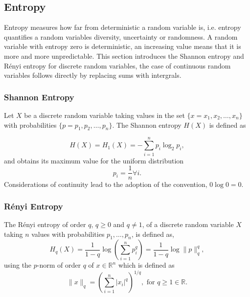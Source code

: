 \documentclass[12pt, twoside]{article}
\newcommand{\R}{\mathbb{R}}
\newcommand{\1}{\mathbb{1}}
\begin{document}
\subsection{Entropy}
Entropy measures how far from deterministic a random variable is, i.e. entropy quantifies a random variables diversity, uncertainty or randomness. 
A random variable with entropy zero is deterministic, an increasing value  means that it is more and more unpredictable.
This section introduces the Shannon entropy and R\'enyi entropy for discrete random variables, the case of continuous random variables follows directly by replacing sums with intergrals.
    
\subsubsection{Shannon Entropy}
Let $ X $ be a discrete random variable taking values in the set $ \{x = x_1, x_2, \ldots, x_n \} $ with probabilities $ \{p = p_1, p_2, \ldots, p_n \} $. The Shannon entropy $ H(X) $ is defined as 

\begin{equation}\label{Shannon1}
    H(X) = H_1(X) = - \sum_{i = 1} ^ n p_i \log_2 p_i,
\end{equation}
and obtains its maximum value for the uniform distribution
$$p_i = \frac{1}{n} \forall i.$$
Considerations of continuity lead to the adoption of the convention, $ 0 \log 0  = 0 $.

\subsubsection{R\'enyi Entropy}
The R\'enyi entropy of order $ q $, $ q  \geq 0 $ and $ q \neq 1 $, of a discrete random variable $ X $ taking $ n $ values with probabilities $ p_1, \ldots, p_n $, is defined as,
\begin{equation}
        H_q(X) = 
        \frac{1}{1 - q} \log \left( \sum_{i=1}^n p_i ^ {q} \right)
        = \frac{1}{1 - q} \log \| p \|_q^q,  
\end{equation}
using the $ p $-norm of order $ q $ of $ x  \in \R ^ n $  which is defined as   
$$ \| x \|_q = \left( \sum_{i=1}^n |x_i|^q \right)^{1/q}, \textrm{ for } q \geq 1 \in \R. $$
\end{document}

